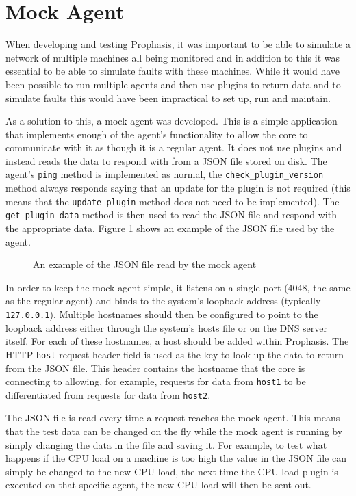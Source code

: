 \documentclass[bsc,deptreport,twoside,parskip,singlespacing,notimes]{infthesis}
\begin{document}
\section{Mock Agent}

	When developing and testing Prophasis, it was important to be able to simulate a
	network of multiple machines all being monitored and in addition to this it
	was essential to be able to simulate faults with these machines. While it would
	have been possible to run multiple agents and then use plugins to return data
	and to simulate faults this would have been impractical to set up, run and maintain.


	As a solution to this, a mock agent was developed.  This is a simple application
	that implements enough of the agent's functionality to allow the core to
	communicate with it as though it is a regular agent.  It does not use plugins
	and instead reads the data to respond with from a JSON file stored on disk. The
	agent's \texttt{ping} method is implemented as normal, the
	\texttt{check\_plugin\_version} method always responds saying that an update for
	the plugin is not required (this means that the \texttt{update\_plugin} method does
	not need to be implemented).  The \texttt{get\_plugin\_data} method is then
	used to read the JSON file and respond with the appropriate data. Figure
	\ref{mock-agent-data} shows an example of the JSON file used by the agent.

\begin{figure}[H]
	\caption{An example of the JSON file read by the mock agent}
	\label{mock-agent-data}
	
\end{figure}


	In order to keep the mock agent simple, it listens on a single port (4048, the
	same as the regular agent) and binds to the system's loopback address 
	(typically \texttt{127.0.0.1}).  Multiple hostnames should then be configured
	to point to the loopback address either through the system's hosts file or on
	the DNS server itself.  For each of these hostnames, a host should be added
	within Prophasis.  The HTTP \texttt{host} request header field is used as the
	key to look up the data to return from the JSON file. This header contains the
	hostname that the core is connecting to allowing, for example, requests for
	data from \texttt{host1} to be differentiated from requests for data from 
	\texttt{host2}.


	The JSON file is read every time a request reaches the mock agent.  This means
	that the test data can be changed on the fly while the mock agent is running by
	simply changing the data in the file and saving it.  For example, to test what
	happens if the CPU load on a machine is too high the value in the JSON file can
	simply be changed to the new CPU load, the next time the CPU
	load plugin is executed on that specific agent, the new CPU load will then be
	sent out.
\end{document}
